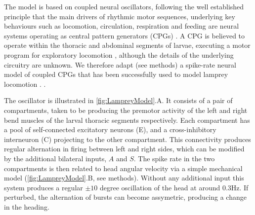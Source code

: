 \documentclass[10pt,a4paper]{article}
\begin{document}
The model is based on coupled neural oscillators, following the well established principle that the main drivers of rhythmic  motor sequences, underlying key behaviours such as locomotion, circulation, respiration and feeding are neural systems operating as central pattern generators (CPGs) \citep{delcomyn1980neural}. A CPG is believed to operate  within the thoracic and abdominal segments of larvae, executing a motor program for exploratory locomotion \citep{berni2012autonomous,lemon2015whole}, although the details of the underlying circuitry are unknown. We therefore adapt (see methods) a spike-rate neural model of coupled CPGs that has been successfully used to model lamprey locomotion \citep{cohen1992modelling,lansner1997realistic}.
\cite[see][]{marder1996principles}.


The oscillator is illustrated in \ref{fig:LampreyModel}.A.  It consists of a pair of compartments, taken to be producing the premotor activity of the left and right bend muscles of the larval thoracic  segments respectively. Each compartment has a pool of self-connected excitatory neurons (E), and a cross-inhibitory interneuron (C) projecting to the other compartment. This connectivity produces regular alternation in firing between left and right sides, which can be modified by the additional bilateral inputs, $A$ and $S$. The spike rate in the two compartments is then related to head angular velocity via a simple mechanical model (\ref{fig:LampreyModel}.B, see methods). Without any additional input this system produces a regular $\pm 10$ degree oscillation of the head at around 0.3Hz. If perturbed, the alternation of bursts can become assymetric, producing a change in the heading. 
\end{document}
